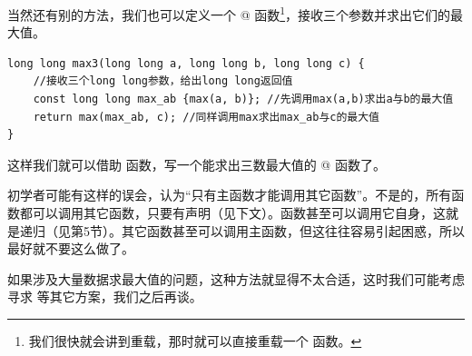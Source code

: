 当然还有别的方法，我们也可以定义一个 @ 函数\footnote{我们很快就会讲到重载，那时就可以直接重载一个 \lstinline@max@ 函数。}，接收三个参数并求出它们的最大值。
\begin{lstlisting}
long long max3(long long a, long long b, long long c) {
    //接收三个long long参数，给出long long返回值
    const long long max_ab {max(a, b)}; //先调用max(a,b)求出a与b的最大值
    return max(max_ab, c); //同样调用max求出max_ab与c的最大值
}
\end{lstlisting}
这样我们就可以借助 \lstinline@max@ 函数，写一个能求出三数最大值的 @ 函数了。\par
初学者可能有这样的误会，认为``只有主函数才能调用其它函数''。不是的，所有函数都可以调用其它函数，只要有声明（见下文）。函数甚至可以调用它自身，这就是递归（见第5节）。其它函数甚至可以调用主函数，但这往往容易引起困惑，所以最好就不要这么做了。\par
如果涉及大量数据求最大值的问题，这种方法就显得不太合适，这时我们可能考虑寻求 \lstinline@valarray@ 等其它方案，我们之后再谈。\par
